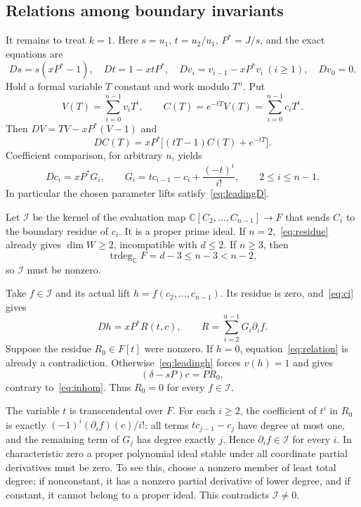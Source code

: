 \documentclass[11pt]{article}
\theoremstyle{remark}\newtheorem{remark}[theorem]{Remark}
\newcommand{\C}{\mathbb C}
\DeclareMathOperator{\trdeg}{trdeg}
\begin{document}
\subsection{Relations among boundary invariants}
It remains to treat $k=1$. Here $s=u_1$, $t=u_2/u_1$, $P^*=J/s$, and the exact equations are
\[
 Ds=s(xP^*-1),\quad Dt=1-xtP^*,\quad
 Dv_i=v_{i-1}-xP^*v_i\ (i\geq1),\quad Dv_0=0.
\]
Hold a formal variable $T$ constant and work modulo $T^n$. Put
\[
 V(T)=\sum_{i=0}^{n-1}v_iT^i,\qquad
 C(T)=e^{-tT}V(T)=\sum_{i=0}^{n-1}c_iT^i.
\]
Then $DV=TV-xP^*(V-1)$ and
\begin{equation}\label{eq:generating}
 DC(T)=xP^*\bigl[(tT-1)C(T)+e^{-tT}\bigr].
\end{equation}
Coefficient comparison, for arbitrary $n$, yields
\begin{equation}\label{eq:ci}
 Dc_i=xP^*G_i,\qquad
 G_i=t c_{i-1}-c_i+\frac{(-t)^i}{i!},\qquad 2\leq i\leq n-1.
\end{equation}
In particular the chosen parameter lifts satisfy~\eqref{eq:leadingD}.

Let $\mathcal I$ be the kernel of the evaluation map
$\C[C_2,\ldots,C_{n-1}]\longrightarrow F$ that sends $C_i$ to the boundary residue of $c_i$. It is a proper prime ideal. If $n=2$,~\eqref{eq:residue} already gives $\dim W\geq2$, incompatible with $d\leq2$. If $n\geq3$, then
\[
 \trdeg_\C F=d-3\leq n-3<n-2,
\]
so $\mathcal I$ must be nonzero.

Take $f\in\mathcal I$ and its actual lift $h=f(c_2,\ldots,c_{n-1})$. Its residue is zero, and~\eqref{eq:ci} gives
\begin{equation}\label{eq:relation}
 Dh=xP^*R(t,c),\qquad R=\sum_{i=2}^{n-1}G_i\partial_i f.
\end{equation}
Suppose the residue $R_0\in F[t]$ were nonzero. If $h=0$, equation~\eqref{eq:relation} is already a contradiction. Otherwise~\eqref{eq:leadingh} forces $v(h)=1$ and gives
\[
 (\delta-sP)c=PR_0,
\]
contrary to~\eqref{eq:inhom}. Thus $R_0=0$ for every $f\in\mathcal I$.

The variable $t$ is transcendental over $F$. For each $i\geq2$, the coefficient of $t^i$ in $R_0$ is exactly $(-1)^i(\partial_i f)(c)/i!$: all terms $t c_{j-1}-c_j$ have degree at most one, and the remaining term of $G_j$ has degree exactly $j$. Hence $\partial_i f\in\mathcal I$ for every $i$. In characteristic zero a proper polynomial ideal stable under all coordinate partial derivatives must be zero. To see this, choose a nonzero member of least total degree; if nonconstant, it has a nonzero partial derivative of lower degree, and if constant, it cannot belong to a proper ideal. This contradicts $\mathcal I\ne0$.
\end{document}
